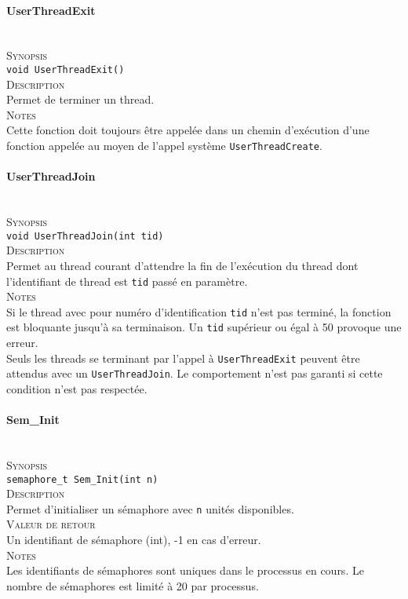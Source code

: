 \documentclass{report}
\newcommand{\myparagraph}[1]{\paragraph*{#1}\mbox{}\\}
\begin{document}
\myparagraph{UserThreadExit}

\textsc{Synopsis}\\
	\texttt{void UserThreadExit()}\\
	
\textsc{Description}\\
	Permet de terminer un thread.\\
	
\textsc{Notes}\\
	Cette fonction doit toujours être appelée dans un chemin d’exécution d'une fonction appelée au moyen de l'appel système \texttt{UserThreadCreate}.
	

\myparagraph{UserThreadJoin}

\textsc{Synopsis}\\
	\texttt{void UserThreadJoin(int tid)}\\
	
\textsc{Description}\\
	Permet au thread courant d'attendre la fin de l'exécution du thread dont l'identifiant de thread est \texttt{tid} passé en paramètre.\\
	
\textsc{Notes}\\
	Si le thread avec pour numéro d'identification \texttt{tid} n'est pas terminé, la fonction est bloquante jusqu'à sa terminaison. Un \texttt{tid} supérieur ou égal à 50 provoque une erreur.\\
Seuls les threads se terminant par l'appel à \texttt{UserThreadExit} peuvent être attendus avec un \texttt{UserThreadJoin}. Le comportement n'est pas garanti si cette condition n'est pas respectée.


\myparagraph{Sem\_Init}
	
	\textsc{Synopsis}\\
		\texttt{semaphore\_t Sem\_Init(int n)}\\

\textsc{Description}\\
	Permet d'initialiser un sémaphore avec \texttt{n} unités disponibles.\\
	
\textsc{Valeur de retour}\\
	Un identifiant de sémaphore (int), -1 en cas d'erreur.\\

\textsc{Notes}\\
	Les identifiants de sémaphores sont uniques dans le processus en cours. Le nombre de sémaphores est limité à 20 par processus.\\
	
\end{document}
